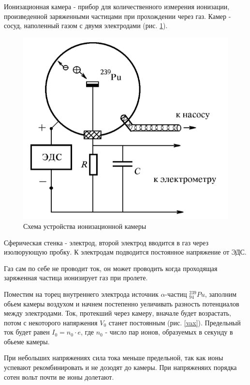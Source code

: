 \documentclass[a4paper]{article}
\begin{document}
Ионизационная камера - прибор для количественного измерения ионизации, произведенной заряженными частицами 
при прохождении через газ. Камер - сосуд, наполенный газом с двумя электродами (рис. \ref{ris ioncam}).

\begin{figure}
    \includegraphics[scale = 0.6]{risioncam.png}
    \caption{Схема устройства ионизационной камеры}
    \label{ris ioncam}
\end{figure}

Сферическая стенка - электрод, второй электрод вводится в газ через изолюрующую пробку.
К электродам подводится постоянное напряжение от ЭДС. \par 

Газ сам по себе не проводит ток, он может проводить когда проходящая заряженная частица 
ионизирует газ при пролете. \par 

Поместим на торец внутреннего электрода источник $\alpha$-частиц $_{94}^{239}Pu$, заполним обьем камеры воздухом 
и начнем постепенно уеличивать разность потенциалов между электродами. Ток, протекший через камеру, вначале будет возрастать,
потом с некоторого напяржения $V_0$ станет постоянным (рис. \ref{vax}). Предельный ток будет равен $I_0 = n_0 \cdot e$, 
где $n_0$ - число пар ионов, образуемых в секунду в обьеме камеры. \par 

При небольших напряжениях сила тока меньше предельной, так как ионы успевают рекомбинировать и не дозодят до 
камеры. При напряженяих порядка сотен вольт почти ве ионы долетают. \par 
\end{document}
